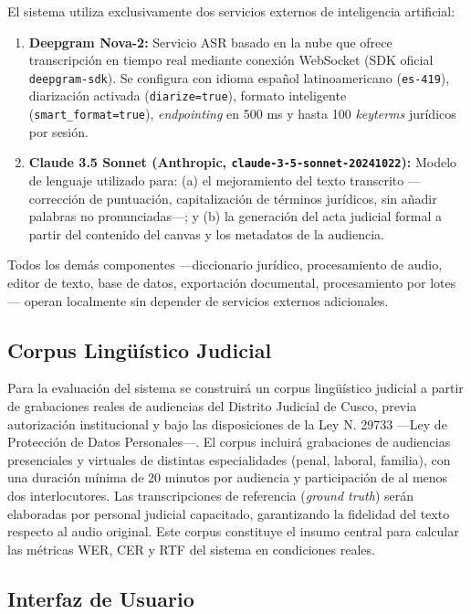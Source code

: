 \documentclass[12pt,a4paper,oneside]{report}
\begin{document}
El sistema utiliza exclusivamente dos servicios externos de inteligencia artificial:

\begin{enumerate}
\item \textbf{Deepgram Nova-2:} Servicio ASR basado en la nube que ofrece transcripción en tiempo real mediante conexión WebSocket (SDK oficial \texttt{deepgram-sdk}). Se configura con idioma español latinoamericano (\texttt{es-419}), diarización activada (\texttt{diarize=true}), formato inteligente (\texttt{smart\_format=true}), \textit{endpointing} en 500 ms y hasta 100 \textit{keyterms} jurídicos por sesión.

\item \textbf{Claude 3.5 Sonnet (Anthropic, \texttt{claude-3-5-sonnet-20241022}):} Modelo de lenguaje utilizado para: (a) el mejoramiento del texto transcrito ---corrección de puntuación, capitalización de términos jurídicos, sin añadir palabras no pronunciadas---; y (b) la generación del acta judicial formal a partir del contenido del canvas y los metadatos de la audiencia.
\end{enumerate}

Todos los demás componentes ---diccionario jurídico, procesamiento de audio, editor de texto, base de datos, exportación documental, procesamiento por lotes--- operan localmente sin depender de servicios externos adicionales.

\subsection{Corpus Lingüístico Judicial}

Para la evaluación del sistema se construirá un corpus lingüístico judicial a partir de grabaciones reales de audiencias del Distrito Judicial de Cusco, previa autorización institucional y bajo las disposiciones de la Ley N.\textordmasculine{} 29733 ---Ley de Protección de Datos Personales---. El corpus incluirá grabaciones de audiencias presenciales y virtuales de distintas especialidades (penal, laboral, familia), con una duración mínima de 20 minutos por audiencia y participación de al menos dos interlocutores. Las transcripciones de referencia (\textit{ground truth}) serán elaboradas por personal judicial capacitado, garantizando la fidelidad del texto respecto al audio original. Este corpus constituye el insumo central para calcular las métricas WER, CER y RTF del sistema en condiciones reales.

\subsection{Interfaz de Usuario}
\end{document}
